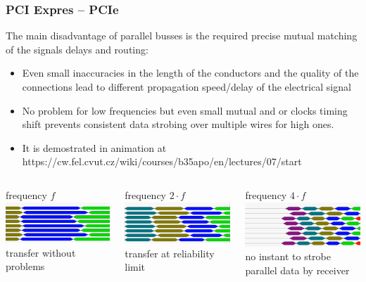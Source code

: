 \documentclass{beamer}
\begin{document}
\begin{frame}
\frametitle{PCI Expres -- PCIe}

The main disadvantage of parallel busses is the required precise mutual matching of the signals delays and routing:
\begin{itemize}
\item Even small inaccuracies in the length of the conductors and the quality of the connections lead to different propagation speed/delay of the electrical signal
\item No problem for low frequencies but even small mutual and or clocks timing shift prevents consistent data strobing over multiple wires for high ones.
\item It is demostrated in animation at https://cw.fel.cvut.cz/wiki/courses/b35apo/en/lectures/07/start
\end{itemize}
\smallskip

\begin{columns}[T]
\begin{column}{0.32\textwidth}
frequency $f$
\includegraphics[width=\textwidth]{fig/freq1.png}
transfer without problems
\end{column}
\begin{column}{0.32\textwidth}
frequency $2\cdot f$
\includegraphics[width=\textwidth]{fig/freq2.png}
transfer at reliability limit
\end{column}
\begin{column}{0.32\textwidth}
frequency $4\cdot f$
\includegraphics[width=\textwidth]{fig/freq4.png}
no instant to strobe parallel data by receiver
\end{column}
\end{columns}


\end{frame}
\end{document}
